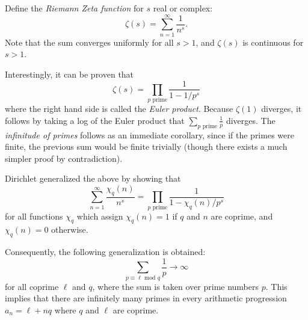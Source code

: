 \documentclass[12pt]{article}
\begin{document}
Define the {\it Riemann Zeta function} for $s$ real or complex:
$$
\zeta(s) = \sum_{n=1}^\infty \frac{1}{n^s}.
$$
Note that the sum converges uniformly for all $s > 1$, and 
$\zeta(s)$ is continuous for $s>1$.

Interestingly, it can be proven that 
$$
\zeta(s) = \prod_{p\text{ prime}} \frac{1}{1-1/p^s}
$$
where the right hand side is called the {\it Euler product}.
Because $\zeta(1)$ diverges, it follows by taking a log of the Euler product
that $\sum_{p\text{ prime}}\frac{1}{p}$ diverges.
The {\it infinitude of primes} follows as an immediate corollary, since 
if the primes were finite, the previous sum would be finite trivially
(though there exists a much simpler proof by contradiction).

Dirichlet generalized the above by showing that
$$
\sum_{n=1}^\infty \frac{\chi_q(n)}{n^s} 
= \prod_{p\text{ prime}} \frac{1}{1-\chi_q(n)/p^s}
$$
for all functions $\chi_q$ which assign $\chi_q(n) = 1$ if $q$ and
$n$ are coprime, and $\chi_q(n) = 0$ otherwise.

Consequently, the following generalization is obtained:
$$
\sum_{p \equiv \ell \text{ mod } q} \frac{1}{p} \rightarrow \infty
$$
for all coprime $\ell$ and $q$, where the sum is taken over prime numbers $p$.
This implies that there are infinitely many primes in every arithmetic
progression $a_n = \ell + nq$ where $q$ and $\ell$ are coprime.
\end{document}
